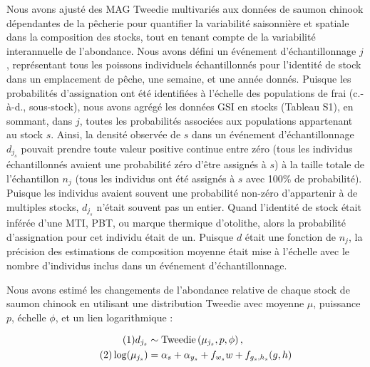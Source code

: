 Nous avons ajusté des MAG Tweedie multivariés aux données de saumon chinook dépendantes de la pêcherie pour quantifier la variabilité saisonnière et spatiale dans la composition des stocks, tout en tenant compte de la variabilité interannuelle de l'abondance. Nous avons défini un événement d'échantillonnage $j$, représentant tous les poissons individuels échantillonnés pour l'identité de stock dans un emplacement de pêche, une semaine, et une année donnés. Puisque les probabilités d'assignation ont été identifiées à l'échelle des populations de frai (c.-à-d., sous-stock), nous avons agrégé les données GSI en stocks (Tableau S1), en sommant, dans $j$, toutes les probabilités associées aux populations appartenant au stock $s$. Ainsi, la densité observée de $s$ dans un événement d'échantillonnage $d_{j_s}$ pouvait prendre toute valeur positive continue entre zéro (tous les individus échantillonnés avaient une probabilité zéro d'être assignés à $s$) à la taille totale de l'échantillon $n_j$ (tous les individus ont été assignés à $s$ avec 100\% de probabilité). Puisque les individus avaient souvent une probabilité non-zéro d'appartenir à de multiples stocks, $d_{j_s}$ n'était souvent pas un entier. Quand l'identité de stock était inférée d'une MTI, PBT, ou marque thermique d'otolithe, alors la probabilité d'assignation pour cet individu était de un. Puisque $d$ était une fonction de $n_j$, la précision des estimations de composition moyenne était mise à l'échelle avec le nombre d'individus inclus dans un événement d'échantillonnage.

Nous avons estimé les changements de l'abondance relative de chaque stock de saumon chinook en utilisant une distribution Tweedie avec moyenne $\mu$, puissance $p$, échelle $\phi$, et un lien logarithmique :

\begin{align}
\label{eq:comp_eq}
\tag{1}
d_{j_s} &\sim \operatorname{Tweedie} \left( \mu_{j_s}, p, \phi \right),\\
\tag{2}
\log(\mu_{j_s}) &= \alpha_s + \alpha_{y_s} + f_{w_{s}}w + f_{{g_s},{h_s}}({g,h})\\
\notag
\end{align}
\noindent

